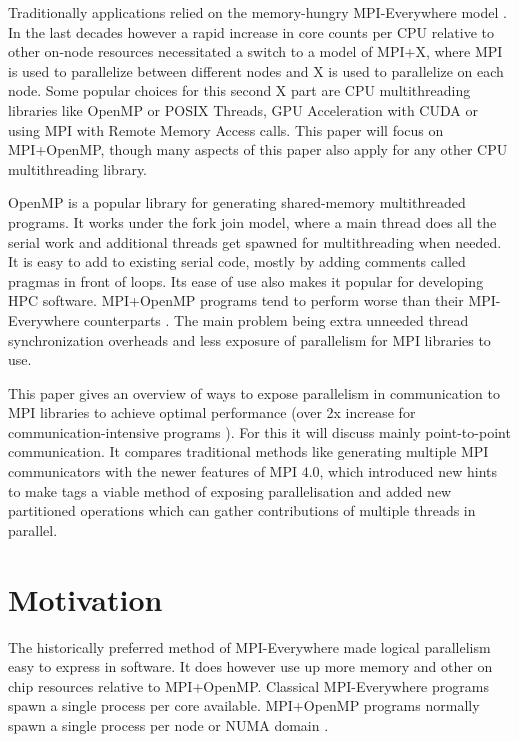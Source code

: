 \documentclass[sigconf]{acmart}
\begin{document}
Traditionally applications relied on the memory-hungry MPI-Everywhere model \cite{zambreLessonsLearned2022}.
In the last decades however a rapid increase in core counts per CPU relative to other on-node resources necessitated a switch to a model of MPI+X,
where MPI is used to parallelize between different nodes and X is used to parallelize on each node.
Some popular choices for this second X part are CPU multithreading libraries like OpenMP or POSIX Threads, GPU Acceleration with CUDA or using MPI with Remote Memory Access calls.
This paper will focus on MPI+OpenMP, though many aspects of this paper also apply for any other CPU multithreading library.

OpenMP is a popular library for generating shared-memory multithreaded programs.
It works under the fork join model, where a main thread does all the serial work and additional threads get spawned for multithreading when needed.
It is easy to add to existing serial code, mostly by adding comments called pragmas in front of loops.
Its ease of use also makes it popular for developing HPC software.
MPI+OpenMP programs tend to perform worse than their MPI-Everywhere counterparts \cite{zambreLessonsLearned2022,zambreLogicalParallel2021}.
The main problem being extra unneeded thread synchronization overheads \cite{zambreLessonsLearned2022} and less exposure of parallelism for MPI libraries to use.

This paper gives an overview of ways to expose parallelism in communication to MPI libraries to achieve optimal performance (over 2x increase for communication-intensive programs \cite{zambreLogicalParallel2021}).
For this it will discuss mainly point-to-point communication. It compares traditional methods like generating multiple MPI communicators with the newer features of MPI 4.0, which introduced new hints to make tags a viable method of exposing parallelisation and added new partitioned operations which can gather contributions of multiple threads in parallel.

\section{Motivation}
The historically preferred method of MPI-Everywhere made logical parallelism easy to express in software.
It does however use up more memory and other on chip resources relative to MPI+OpenMP.
Classical MPI-Everywhere programs spawn a single process per core available.
MPI+OpenMP programs normally spawn a single process per node or NUMA domain \cite{zambreLessonsLearned2022}.
\end{document}

